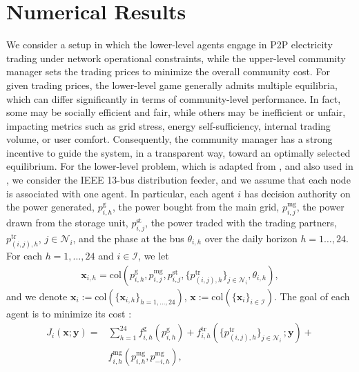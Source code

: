 \documentclass[letterpaper, 10 pt, conference]{ieeeconf}
\newcommand\xbf{\mathbf{x}}
\newcommand\ybf{\mathbf{y}}
\begin{document}
\section{Numerical Results}\label{NumRes}
We consider a setup in which the lower-level agents engage in P2P electricity trading under network operational constraints, while the upper-level community manager sets the trading prices to minimize the overall community cost. For given trading prices, the lower-level game generally admits multiple equilibria, which can differ significantly in terms of community-level performance. In fact, some may be socially efficient and fair, while others may be inefficient or unfair, impacting metrics such as grid stress, energy self-sufficiency, internal trading volume, or user comfort. Consequently, the community manager has a strong incentive to guide the system, in a transparent way, toward an optimally selected equilibrium. For the lower-level problem, which is adapted from \cite{9732452}, and also used in \cite{benenatix2023optimal}, we consider the IEEE 13-bus distribution feeder, and we assume that each node is associated with one agent. In particular, each agent $i$ has decision authority on the power generated, $p^\mathrm{g}_{i,h}$, the power bought from the main grid, $p^\mathrm{mg}_{i,j}$, the power drawn from the storage unit, $p^\mathrm{st}_{i,j}$, the power traded with the trading partners, $p^\mathrm{tr}_{(i,j),h}$, $j \in \mathcal{N}_i$, and the phase at the
bus $\theta_{i,h}$ over the daily horizon $h = 1\dots,24$. For each $h=1,\dots,24$ and $i \in \mathcal{I}$, we let \begin{align*}
\xbf_{i,h}=\mathrm{col}\left(p^\mathrm{g}_{i,h}, p^\mathrm{mg}_{i,j}, p^\mathrm{st}_{i,j}, \{p^\mathrm{tr}_{(i,j),h}\}_{j \in \mathcal{N}_i}, \theta_{i,h}\right),
\end{align*}
and we denote $\xbf_i:=\mathrm{col}\left(\{\xbf_{i,h}\}_{h=1, \dots, 24}\right)$, $\xbf:=\mathrm{col}\left(\{\xbf_{i}\}_{i \in \mathcal{I}}\right)$. The goal of each agent is to minimize its cost \cite[Eq. (17)]{9732452}:
\begin{equation}
\begin{aligned}
    J_i(\xbf; \ybf)=&\sum_{h=1}^{24} f_{i,h}^\mathrm{g}(p_{i,h}^\mathrm{g})+f_{i,h}^\mathrm{tr}(\{p_{(i,j),h}^\mathrm{tr}\}_{j \in \mathcal{N}_i}\,; \ybf)+ \\
    &f_{i,h}^\mathrm{mg}(p_{i,h}^\mathrm{mg}, p_{-i,h}^\mathrm{mg}),
\end{aligned}
\end{equation}
\end{document}
